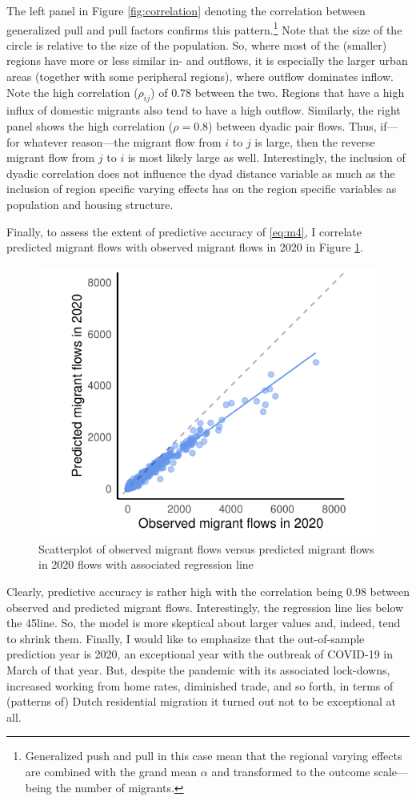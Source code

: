 \documentclass[11pt,parskip,abstracton,notitlepage, dvipsnames]{scrartcl}
\begin{document}
The left panel in Figure \ref{fig:correlation} denoting the correlation between generalized pull and pull factors confirms this pattern.\footnote{Generalized push and pull in this case mean that the regional varying effects are combined with the grand mean $\alpha$ and transformed to the outcome scale---being the number of migrants.} Note that the size of the circle is relative to the size of the population. So, where most of the (smaller) regions have more or less similar in- and outflows, it is especially the larger urban areas (together with some peripheral regions), where outflow dominates inflow. Note the high correlation ($\rho_{ij}$) of $0.78$ between the two. Regions that have a high influx of domestic migrants also tend to have a high outflow. Similarly, the right panel shows the high correlation ($\rho = 0.8$) between dyadic pair flows. Thus, if---for whatever reason---the migrant flow from $i$ to $j$ is large, then the reverse migrant flow from $j$ to $i$ is most likely large as well. Interestingly, the inclusion of dyadic correlation does not influence the dyad distance variable as much as the inclusion of region specific varying effects has on the region specific variables as population and housing structure. 

Finally, to assess the extent of predictive accuracy of \ref{eq:m4}, I correlate predicted migrant flows with observed migrant flows in 2020 in Figure \ref{fig:pred}.
\begin{figure}[ht]\centering %
  \includegraphics[width=0.5\linewidth]{./../../fig/prediction_2020.pdf}
  \caption{Scatterplot of observed migrant flows versus predicted migrant flows in 2020 flows with associated regression line}
  \label{fig:pred}
\end{figure}
Clearly, predictive accuracy is rather high with the correlation being 0.98 between observed and predicted migrant flows. Interestingly, the regression line lies below the 45\degree line. So, the model is more skeptical about larger values and, indeed, tend to shrink them. Finally, I would like to emphasize that the out-of-sample prediction year is 2020, an exceptional year with the outbreak of COVID-19 in March of that year. But, despite the pandemic with its associated lock-downs, increased working from home rates, diminished trade, and so forth, in terms of (patterns of) Dutch residential migration it turned out not to be exceptional at all. 
\end{document}
